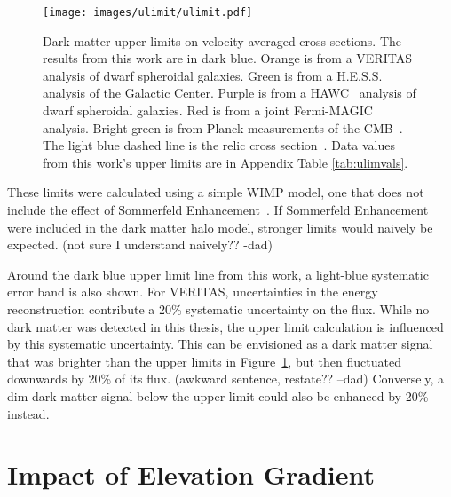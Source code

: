   \begin{figure}[ht]
    \centering
    \texttt{[image: images/ulimit/ulimit.pdf]}
    \caption[Dark Matter Upper Limit Plot]{
      Dark matter upper limits on velocity-averaged cross sections.
      The results from this work are in dark blue.
      Orange is from a VERITAS~\cite{veritas_dm_limit} analysis of dwarf spheroidal galaxies.
      Green is from a H.E.S.S.~\cite{hess_dm_limit} analysis of the Galactic Center.
      Purple is from a HAWC~\cite{hawc_dm_limit} analysis of dwarf spheroidal galaxies.
      Red is from a joint Fermi-MAGIC~\cite{fermagicul} analysis.
      Bright green is from Planck measurements of the CMB~\cite{planck_dm_limit}.
      The light blue dashed line is the relic cross section~\cite{updatedWIMPRelicCrossSection}.
      Data values from this work's upper limits are in Appendix Table \ref{tab:ulimvals}.
    }
    \label{fig:ulim}
  \end{figure}
  
  These limits were calculated using a simple WIMP model, one that does not include the effect of Sommerfeld Enhancement~\cite{sommerfeld}.
  If Sommerfeld Enhancement were included in the dark matter halo model, stronger limits would naively be expected.
  {\color{red}(not sure I understand naively?? -dad)}
  
  Around the dark blue upper limit line from this work, a light-blue systematic error band is also shown.
  For VERITAS, uncertainties in the energy reconstruction contribute a \nicetilde{}20\% systematic uncertainty on the flux.
  While no dark matter was detected in this thesis, the upper limit calculation is influenced by this systematic uncertainty.
  This can be envisioned as a dark matter signal that was brighter than the upper limits in Figure~\ref{fig:ulim}, but then fluctuated downwards by 20\% of its flux.
  {\color{red}(awkward sentence, restate?? --dad)}
  Conversely, a dim dark matter signal below the upper limit could also be enhanced by 20\% instead.
  
  \FloatBarrier

\section{Impact of Elevation Gradient}\label{sec:elevgradient}

